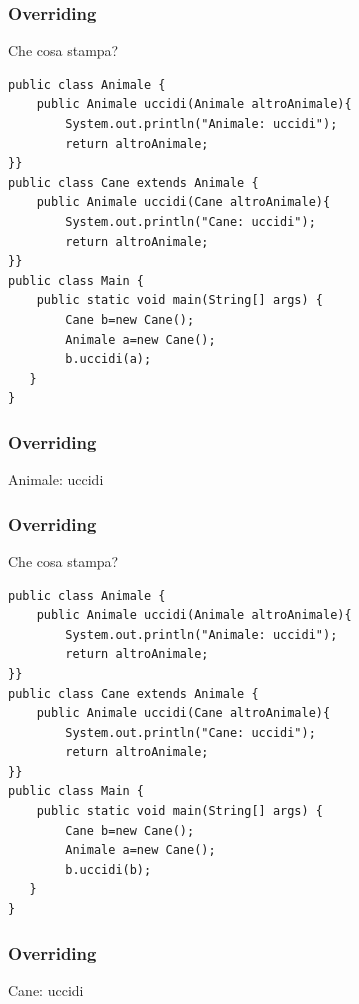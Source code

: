 \documentclass{beamer}
\begin{document}
\begin{frame}[fragile]
\frametitle{Overriding}
\begin{framed}
Che cosa stampa?
\begin{lstlisting}
public class Animale {
	public Animale uccidi(Animale altroAnimale){
	    System.out.println("Animale: uccidi");
	    return altroAnimale;
}}
public class Cane extends Animale {
	public Animale uccidi(Cane altroAnimale){
	    System.out.println("Cane: uccidi");
	    return altroAnimale;
}}
public class Main {
    public static void main(String[] args) {
        Cane b=new Cane();
        Animale a=new Cane();
        b.uccidi(a);
   }
}
\end{lstlisting}
\end{framed}
\end{frame}

\begin{frame}[fragile]
\frametitle{Overriding}
\begin{framed}
Animale: uccidi
\end{framed}
\end{frame}


\begin{frame}[fragile]
\frametitle{Overriding}
\begin{framed}
Che cosa stampa?
\begin{lstlisting}
public class Animale {
    public Animale uccidi(Animale altroAnimale){
        System.out.println("Animale: uccidi");
        return altroAnimale;
}}
public class Cane extends Animale {
    public Animale uccidi(Cane altroAnimale){
        System.out.println("Cane: uccidi");
        return altroAnimale;
}}
public class Main {
    public static void main(String[] args) {
        Cane b=new Cane();
        Animale a=new Cane();
        b.uccidi(b);
   }
}
\end{lstlisting}
\end{framed}
\end{frame}

\begin{frame}[fragile]
\frametitle{Overriding}
\begin{framed}
Cane: uccidi
\end{framed}
\end{frame}
\end{document}
